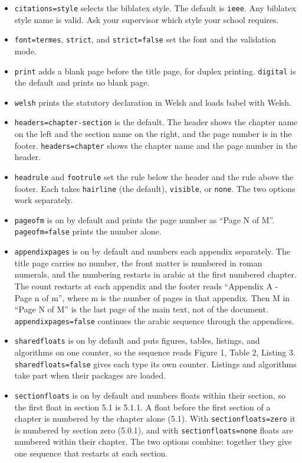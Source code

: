 \documentclass[dissertation,tables,glossary,12pt,a4paper]{bangor}
\begin{document}
\begin{itemize}
  \item \verb|citations=style| selects the biblatex style. The default is \verb|ieee|. Any biblatex style name is valid. Ask your supervisor which style your school requires.
  \item \verb|font=termes|, \verb|strict|, and \verb|strict=false| set the font and the validation mode.
  \item \verb|print| adds a blank page before the title page, for duplex printing. \verb|digital| is the default and prints no blank page.
  \item \verb|welsh| prints the statutory declaration in Welsh and loads babel with Welsh.
  \item \verb|headers=chapter-section| is the default. The header shows the chapter name on the left and the section name on the right, and the page number is in the footer. \verb|headers=chapter| shows the chapter name and the page number in the header.
  \item \verb|headrule| and \verb|footrule| set the rule below the header and the rule above the footer. Each takes \verb|hairline| (the default), \verb|visible|, or \verb|none|. The two options work separately.
  \item \verb|pageofm| is on by default and prints the page number as ``Page N of M''. \verb|pageofm=false| prints the number alone.
  \item \verb|appendixpages| is on by default and numbers each appendix separately. The title page carries no number, the front matter is numbered in roman numerals, and the numbering restarts in arabic at the first numbered chapter. The count restarts at each appendix and the footer reads ``Appendix A - Page n of m'', where m is the number of pages in that appendix. Then M in ``Page N of M'' is the last page of the main text, not of the document. \verb|appendixpages=false| continues the arabic sequence through the appendices.
  \item \verb|sharedfloats| is on by default and puts figures, tables, listings, and algorithms on one counter, so the sequence reads Figure 1, Table 2, Listing 3. \verb|sharedfloats=false| gives each type its own counter. Listings and algorithms take part when their packages are loaded.
  \item \verb|sectionfloats| is on by default and numbers floats within their section, so the first float in section 5.1 is 5.1.1. A float before the first section of a chapter is numbered by the chapter alone (5.1). With \verb|sectionfloats=zero| it is numbered by section zero (5.0.1), and with \verb|sectionfloats=none| floats are numbered within their chapter. The two options combine: together they give one sequence that restarts at each section.

\end{itemize}
\end{document}
